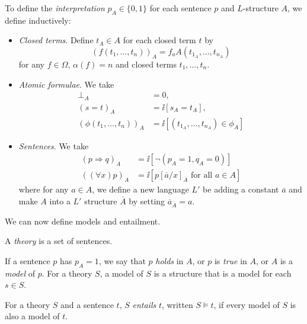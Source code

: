 \documentclass[a3paper, 10pt]{article}
\renewcommand{\vocab}[1]{\emph{#1}}
\begin{document}
\begin{multicols*}{5}
\begin{definition}[Interpretation]
  To define the \vocab{interpretation} $p_A \in \{0, 1\}$ for each sentence $p$ and $L$-structure $A$, we define inductively:
  \begin{itemize}
    \item \emph{Closed terms}. Define $t_A \in A$ for each closed term $t$ by
    $$
    (f(t_1, \dots, t_n))_A = f_aA(t_{1_A}, \dots, t_{n_A}) 
    $$
    for any $f \in \Omega$, $\alpha(f) = n$ and closed terms $t_1, \dots, t_n$.
    \item \emph{Atomic formulae}. We take
    \begin{align*}
      \bot_A &=0,\\
      (s = t)_A &= \ii[s_A = t_A],\\
      (\phi(t_1, \dots, t_n))_A &= \ii[(t_{1_A}, \dots, t_{n_A}) \in \phi_A]
    \end{align*}
    \item \emph{Sentences}. We take
    \begin{align*}
      (p \Rightarrow q)_A &= \ii[\lnot(p_A = 1, q_A = 0)] \\
      ((\forall x)p)_A &= \ii[p[\overline{a}/x]_{\overline{A}}\text{ for all }a\in A]
    \end{align*}
    where for any $a \in A$, we define a new language $L'$ be adding a constant $\overline{a}$ and make $A$ into a $L'$ structure $\overline{A}$ by setting $\overline{a}_{\overline{A}} = a$.
  \end{itemize}
\end{definition}

We can now define models and entailment.

\begin{definition}[Theory]
  A \vocab{theory} is a set of sentences.
\end{definition}

\begin{definition}[Model]
  If a sentence $p$ has $p_A = 1$, we say that $p$ \vocab{holds} in $A$, or $p$ is \vocab{true} in $A$, or $A$ is a \vocab{model} of $p$. For a theory $S$, a model of $S$ is a structure that is a model for each $s \in S$.
\end{definition}

\begin{definition}
  For a theory $S$ and a sentence $t$, $S$ \vocab{entails} $t$, written $S \models t$, if every model of $S$ is also a model of $t$.
\end{definition}


\end{multicols*}
\end{document}
